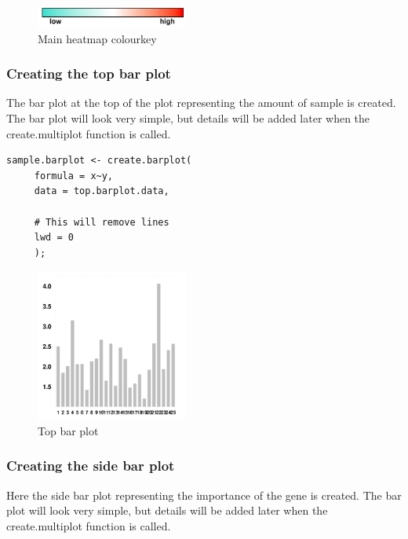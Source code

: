 \documentclass[letterpaper]{article}
\begin{document}
\begin{figure}[!ht]
  \begin{center}
     \includegraphics[width=50mm]{Figures/ex2_colourkey.png}
     \caption{Main heatmap colourkey}
     \label{fig:picture}
  \end{center}
\end{figure}

\subsubsection{Creating the top bar plot}
The bar plot at the top of the plot representing the amount of sample is created. The bar plot will look very simple, but details will be added later when the create.multiplot function is called.

\begin{verbatim}
sample.barplot <- create.barplot(
     formula = x~y,
     data = top.barplot.data,
     
     # This will remove lines
     lwd = 0
     );
\end{verbatim}

\begin{figure}[!ht]
  \begin{center}
     \includegraphics[width=50mm]{Figures/ex2_sample_barplot.png}
     \caption{Top bar plot}
     \label{fig:picture}
  \end{center}
\end{figure}

\subsubsection{Creating the side bar plot}

Here the side bar plot representing the importance of the gene is created. The bar plot will look very simple, but details will be added later when the create.multiplot function is called.
\end{document}
